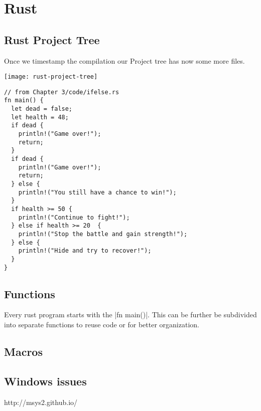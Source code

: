\chapter{Rust}


\section{Rust Project Tree}

Once we timestamp the compilation our Project tree has now some more files.

\texttt{[image: rust-project-tree]}


\begin{verbatim}
// from Chapter 3/code/ifelse.rs
fn main() {
  let dead = false;
  let health = 48;
  if dead {
    println!("Game over!");
    return;
  }
  if dead {
    println!("Game over!");
    return;
  } else {
    println!("You still have a chance to win!");
  }
  if health >= 50 {
    println!("Continue to fight!");
  } else if health >= 20  {
    println!("Stop the battle and gain strength!");
  } else {
    println!("Hide and try to recover!");
  }
}
\end{verbatim}


\section{Functions}

Every rust program starts with the |fn main()|. This can be further be subdivided into separate
functions to reuse code or for better organization. 


\section{Macros}

\section{Windows issues}

http://msys2.github.io/


